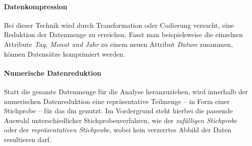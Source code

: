 \paragraph{Datenkompression}
\label{datenkompression}
Bei dieser Technik wird durch Transformation oder Codierung versucht, eine Reduktion der Datenmenge zu erreichen. Fasst man beispielsweise die einzelnen Attribute \textit{Tag, Monat und Jahr} zu einem neuen Attribut \textit{Datum} zusammen, können Datensätze komprimiert werden.
 
\paragraph{Numerische Datenreduktion}
Statt die gesamte Datenmenge für die Analyse heranzuziehen, wird innerhalb der numerischen Datenreduktion eine repräsentative Teilmenge -- in Form einer Stichprobe -- für das \gls{dm} genutzt. Im Vordergrund steht hierbei die passende Auswahl unterschiedlicher Stichprobenverfahren, wie der \textit{zufälligen Stichprobe} oder der \textit{repräsentativen Stichprobe}, wobei kein verzerrtes Abbild der Daten resultieren darf.
